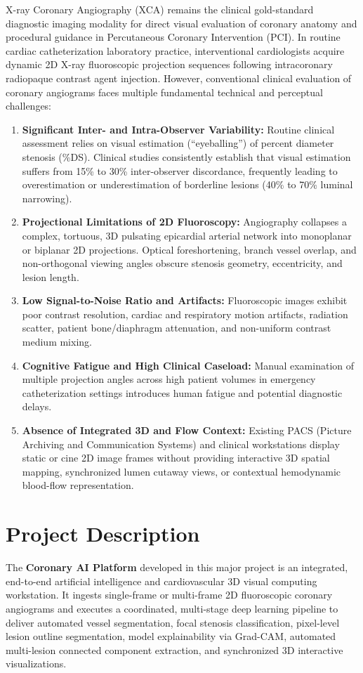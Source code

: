 X-ray Coronary Angiography (XCA) remains the clinical gold-standard diagnostic imaging modality for direct visual evaluation of coronary anatomy and procedural guidance in Percutaneous Coronary Intervention (PCI). In routine cardiac catheterization laboratory practice, interventional cardiologists acquire dynamic 2D X-ray fluoroscopic projection sequences following intracoronary radiopaque contrast agent injection. However, conventional clinical evaluation of coronary angiograms faces multiple fundamental technical and perceptual challenges:
\begin{enumerate}
    \item \textbf{Significant Inter- and Intra-Observer Variability:} Routine clinical assessment relies on visual estimation (``eyeballing'') of percent diameter stenosis (\%DS). Clinical studies consistently establish that visual estimation suffers from 15\% to 30\% inter-observer discordance, frequently leading to overestimation or underestimation of borderline lesions (40\% to 70\% luminal narrowing).
    \item \textbf{Projectional Limitations of 2D Fluoroscopy:} Angiography collapses a complex, tortuous, 3D pulsating epicardial arterial network into monoplanar or biplanar 2D projections. Optical foreshortening, branch vessel overlap, and non-orthogonal viewing angles obscure stenosis geometry, eccentricity, and lesion length.
    \item \textbf{Low Signal-to-Noise Ratio and Artifacts:} Fluoroscopic images exhibit poor contrast resolution, cardiac and respiratory motion artifacts, radiation scatter, patient bone/diaphragm attenuation, and non-uniform contrast medium mixing.
    \item \textbf{Cognitive Fatigue and High Clinical Caseload:} Manual examination of multiple projection angles across high patient volumes in emergency catheterization settings introduces human fatigue and potential diagnostic delays.
    \item \textbf{Absence of Integrated 3D and Flow Context:} Existing PACS (Picture Archiving and Communication Systems) and clinical workstations display static or cine 2D image frames without providing interactive 3D spatial mapping, synchronized lumen cutaway views, or contextual hemodynamic blood-flow representation.
\end{enumerate}

\section{Project Description}
The \textbf{Coronary AI Platform} developed in this major project is an integrated, end-to-end artificial intelligence and cardiovascular 3D visual computing workstation. It ingests single-frame or multi-frame 2D fluoroscopic coronary angiograms and executes a coordinated, multi-stage deep learning pipeline to deliver automated vessel segmentation, focal stenosis classification, pixel-level lesion outline segmentation, model explainability via Grad-CAM, automated multi-lesion connected component extraction, and synchronized 3D interactive visualizations.

